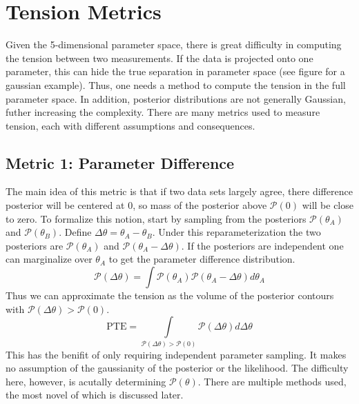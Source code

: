 \section{Tension Metrics}
Given the 5-dimensional parameter space, there is great difficulty in computing the tension between two measurements. If the data is projected onto one parameter, this can hide the true separation in parameter space (see figure for a gaussian example). Thus, one needs a method to compute the tension in the full parameter space. In addition, posterior distributions are not generally Gaussian, futher increasing the complexity. There are many metrics used to measure tension, each with different assumptions and consequences.

\subsection{Metric 1: Parameter Difference}
The main idea of this metric is that if two data sets largely agree, there difference posterior will be centered at 0, so mass of the posterior above $\mathcal{P}(0)$ will be close to zero. To formalize this notion, start by sampling from the posteriors $\mathcal{P}(\theta_A)$ and $\mathcal{P}(\theta_B)$.
Define $\Delta\theta = \theta_A - \theta_B$. Under this reparameterization the two posteriors are $\mathcal{P}(\theta_A)$ and $\mathcal{P}(\theta_A-\Delta\theta)$. If the posteriors are independent one can marginalize over $\theta_A$ to get the parameter difference distribution.
\begin{equation}
    \mathcal{P}(\Delta\theta) = \int \mathcal{P}(\theta_A)\mathcal{P}(\theta_A - \Delta\theta) d\theta_A
\end{equation}
Thus we can approximate the tension as the volume of the posterior contours with $\mathcal{P}(\Delta\theta)>\mathcal{P}(0)$.
\begin{equation}
    \mathrm{PTE} = \int\limits_{\mathcal{P}(\Delta\theta)>\mathcal{P}(0)}\mathcal{P}(\Delta\theta) d\Delta\theta
\end{equation}
This has the benifit of only requiring independent parameter sampling. It makes no assumption of the gaussianity of the posterior or the likelihood. The difficulty here, however, is acutally determining $\mathcal{P}(\theta)$. There are multiple methods used, the most novel of which is discussed later.

